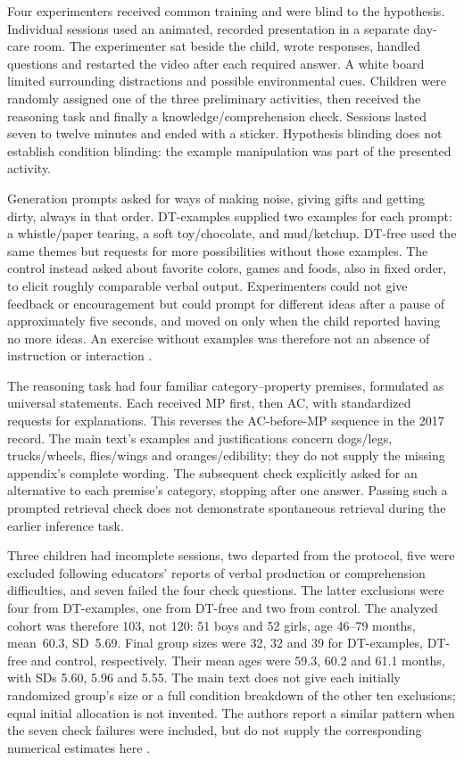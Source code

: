 Four experimenters received common training and were blind to the hypothesis.
Individual sessions used an animated, recorded presentation in a separate
day-care room. The experimenter sat beside the child, wrote responses,
handled questions and restarted the video after each required answer. A
white board limited surrounding distractions and possible environmental cues.
Children were randomly assigned one of the three preliminary activities,
then received the reasoning task and finally a knowledge/comprehension check.
Sessions lasted seven to twelve minutes and ended with a sticker. Hypothesis
blinding does not establish condition blinding: the example manipulation was
part of the presented activity.

Generation prompts asked for ways of making noise, giving gifts and getting
dirty, always in that order. DT-examples supplied two examples for each
prompt: a whistle/paper tearing, a soft toy/chocolate, and mud/ketchup.
DT-free used the same themes but requests for more possibilities without
those examples. The control instead asked about favorite colors, games and
foods, also in fixed order, to elicit roughly comparable verbal output.
Experimenters could not give feedback or encouragement but could prompt for
different ideas after a pause of approximately five seconds, and moved on
only when the child reported having no more ideas. An exercise without
examples was therefore not an absence of instruction or interaction
\cite[pp.~108--111]{DeChantal2021ThesisSelectedStudy}.

The reasoning task had four familiar category--property premises, formulated
as universal statements. Each received MP first, then AC, with standardized
requests for explanations. This reverses the AC-before-MP sequence in the
2017 record. The main text's examples and justifications concern dogs/legs,
trucks/wheels, flies/wings and oranges/edibility; they do not supply the
missing appendix's complete wording. The subsequent check explicitly asked
for an alternative to each premise's category, stopping after one answer.
Passing such a prompted retrieval check does not demonstrate spontaneous
retrieval during the earlier inference task.

Three children had incomplete sessions, two departed from the protocol,
five were excluded following educators' reports of verbal production or
comprehension difficulties, and seven failed the four check questions.
The latter exclusions were four from DT-examples, one from DT-free and
two from control. The analyzed cohort was therefore 103, not 120:
51 boys and 52 girls, age 46--79 months, mean~60.3, SD~5.69.
Final group sizes were 32, 32 and 39 for DT-examples, DT-free and control,
respectively. Their mean ages were 59.3, 60.2 and 61.1 months, with SDs
5.60, 5.96 and 5.55. The main text does not give each initially randomized
group's size or a full condition breakdown of the other ten exclusions;
equal initial allocation is not invented. The authors report a similar
pattern when the seven check failures were included, but do not supply
the corresponding numerical estimates here
\cite[p.~112]{DeChantal2021ThesisSelectedStudy}.

